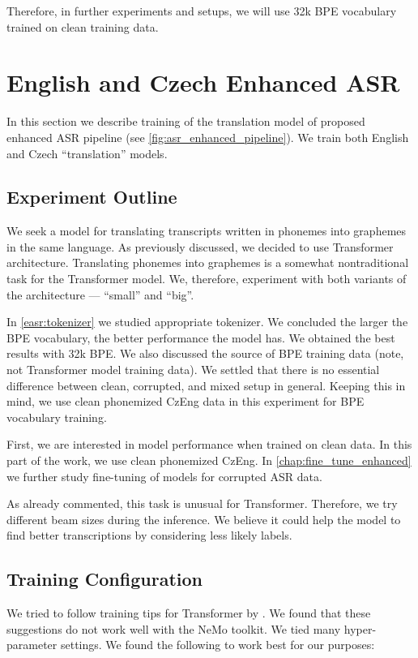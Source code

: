 Therefore, in further experiments and setups, we will use 32k BPE vocabulary trained on clean training data.









\section{English and Czech Enhanced ASR}
\label{easr:english}
In this section we describe training of the translation model of proposed enhanced ASR pipeline (see \cref{fig:asr_enhanced_pipeline}). We train both English and Czech ``translation'' models.

\subsection{Experiment Outline}
\label{easr:outline}
We seek a model for translating transcripts written in phonemes into graphemes in the same language. As previously discussed, we decided to use Transformer architecture. Translating phonemes into graphemes is a somewhat nontraditional task for the Transformer model. We, therefore, experiment with both variants of the architecture --- ``small'' and ``big''. 

In \cref{easr:tokenizer} we studied appropriate tokenizer. We concluded the larger the BPE vocabulary, the better performance the model has. We obtained the best results with 32k BPE. We also discussed the source of BPE training data (note, not Transformer model training data). We settled that there is no essential difference between clean, corrupted, and mixed setup in general. Keeping this in mind, we use clean phonemized CzEng data in this experiment for BPE vocabulary training. 

First, we are interested in model performance when trained on clean data. In this part of the work, we use clean phonemized CzEng. In \cref{chap:fine_tune_enhanced} we further study fine-tuning of models for corrupted ASR data.

As already commented, this task is unusual for Transformer. Therefore, we try different beam sizes during the inference. We believe it could help the model to find better transcriptions by considering less likely labels.

\subsection{Training Configuration}
\label{easr:training}
We tried to follow training tips for Transformer by . We found that these suggestions do not work well with the NeMo toolkit. We tied many hyper-parameter settings. We found the following to work best for our purposes:


